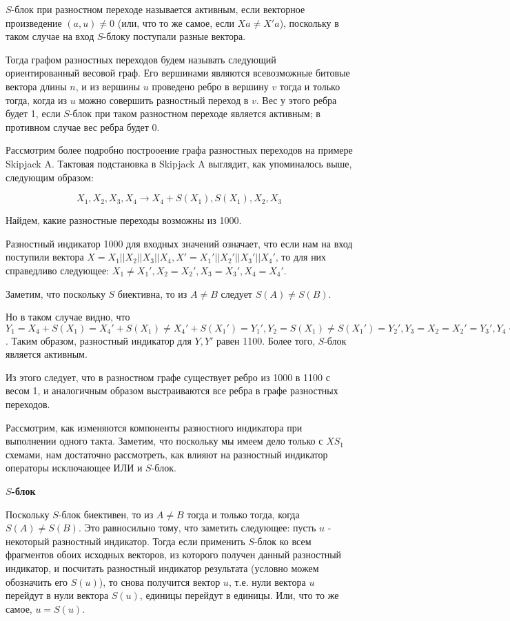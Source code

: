 \documentclass[a4paper,12pt]{extarticle}
\begin{document}
\begin{large}
$S$-блок при разностном переходе называется активным, если векторное произведение $(a, u) \neq 0$ (или, что то же самое, если $Xa \neq X'a$), поскольку в таком случае на вход $S$-блоку поступали разные вектора.

Тогда графом разностных переходов будем называть следующий ориентированный весовой граф. Его вершинами являются всевозможные битовые вектора длины $n$, и из вершины $u$ проведено ребро в вершину $v$ тогда и только тогда, когда из $u$ можно совершить разностный переход в $v$. Вес у этого ребра будет 1, если $S$-блок при таком разностном переходе является активным; в противном случае вес ребра будет 0.

Рассмотрим более подробно построоение графа разностных переходов на примере Skipjack A. Тактовая подстановка в Skipjack A выглядит, как упоминалось выше, следующим образом:

$$X_1, X_2, X_3, X_4 \rightarrow X_4 + S(X_1), S(X_1), X_2, X_3$$

Найдем, какие разностные переходы возможны из 1000.

Разностный индикатор 1000 для входных значений означает, что если нам на вход поступили вектора $X=X_1||X_2||X_3||X_4, X'=X_1'||X_2'||X_3'||X_4'$, то для них справедливо следующее: $X_1\neq X_1', X_2=X_2', X_3 = X_3', X_4 = X_4'$. 

Заметим, что поскольку $S$ биективна, то из $A \neq B$ следует $S(A) \neq S(B)$.

Но в таком случае видно, что $Y_1=X_4 + S(X_1)=X_4' + S(X_1)\neq X_4' + S(X_1')=Y_1', Y_2=S(X_1)\neq S(X_1')=Y_2', Y_3=X_2=X_2'=Y_3', Y_4=X_3= X_3'=Y_4'$. Таким образом, разностный индикатор для $Y, Y'$ равен 1100. Более того, $S$-блок является активным.

Из этого следует, что в разностном графе существует ребро из 1000 в 1100 с весом 1, и аналогичным образом выстраиваются все ребра в графе разностных переходов.

Рассмотрим, как изменяются компоненты разностного индикатора при выполнении одного такта. Заметим, что поскольку мы имеем дело только с $XS_1$ схемами, нам достаточно рассмотреть, как влияют на разностный индикатор операторы исключающее ИЛИ и $S$-блок.


\textbf{$S$-блок}

Поскольку $S$-блок биективен, то из $A \neq B$ тогда и только тогда, когда $S(A) \neq S(B)$. Это равносильно тому, что заметить следующее: пусть $u$ - некоторый разностный индикатор. Тогда если применить $S$-блок ко всем фрагментов обоих исходных векторов, из которого получен данный разностный индикатор, и посчитать разностный индикатор результата (условно можем обозначить его $S(u)$), то снова получится вектор $u$, т.е. нули вектора $u$ перейдут в нули вектора $S(u)$, единицы перейдут в единицы. Или, что то же самое, $u=S(u)$.


\end{large}
\end{document}
